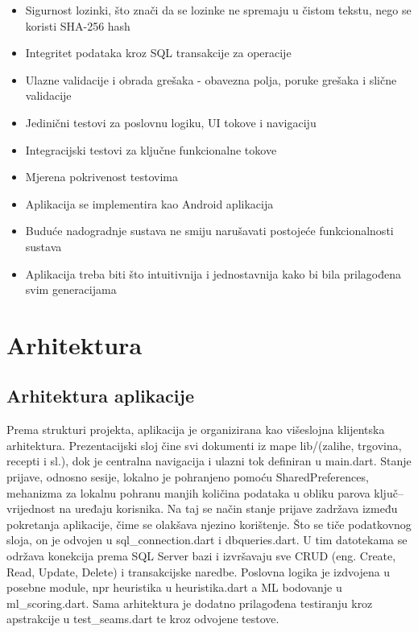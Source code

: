 \documentclass[diplomskirad]{fer}
\begin{document}
\begin{itemize}
    \item Sigurnost lozinki, što znači da se lozinke ne spremaju u čistom tekstu, nego se koristi SHA-256 hash
    \item Integritet podataka kroz SQL transakcije za operacije
    \item Ulazne validacije i obrada grešaka - obavezna polja, poruke grešaka i slične validacije
    \item Jedinični testovi za poslovnu logiku, UI tokove i navigaciju
    \item Integracijski testovi za ključne funkcionalne tokove
    \item Mjerena pokrivenost testovima
    \item Aplikacija se implementira kao Android aplikacija 
    \item Buduće nadogradnje sustava ne smiju narušavati postojeće funkcionalnosti sustava
    \item Aplikacija treba biti što intuitivnija i jednostavnija kako bi bila prilagođena svim generacijama
\end{itemize}

\chapter{Arhitektura}
\section{Arhitektura aplikacije}
Prema strukturi projekta, aplikacija je organizirana kao višeslojna klijentska arhitektura. Prezentacijski sloj čine svi dokumenti iz mape lib/(zalihe, trgovina, recepti i sl.), dok je centralna navigacija i ulazni tok definiran u main.dart. Stanje prijave, odnosno sesije, lokalno je pohranjeno pomoću SharedPreferences, mehanizma za lokalnu pohranu manjih količina podataka u obliku parova ključ–vrijednost na uređaju korisnika. Na taj se način stanje prijave zadržava između pokretanja aplikacije, čime se olakšava njezino korištenje.
 Što se tiče podatkovnog sloja, on je odvojen u sql\_connection.dart i dbqueries.dart. U tim datotekama se održava konekcija prema SQL Server bazi i izvršavaju sve CRUD (eng. Create, Read, Update, Delete) i transakcijske naredbe. Poslovna logika je izdvojena u posebne module, npr heuristika u heuristika.dart a ML bodovanje u ml\_scoring.dart. Sama arhitektura je dodatno prilagođena testiranju kroz apstrakcije u test\_seams.dart te kroz odvojene testove. 
\end{document}
